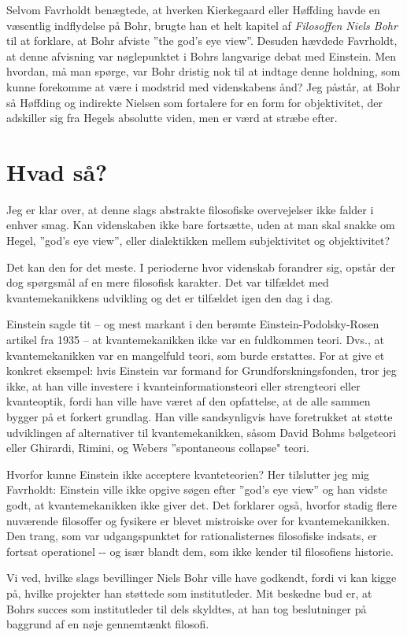 \documentclass[12pt]{article}
\begin{document}
Selvom Favrholdt benægtede, at hverken Kierkegaard eller Høffding havde
en væsentlig indflydelse på Bohr, brugte han et helt kapitel af
\emph{Filosoffen Niels Bohr} til at forklare, at Bohr afviste ''the
god's eye view''. Desuden hævdede Favrholdt, at denne afvisning var
nøglepunktet i Bohrs langvarige debat med Einstein. Men hvordan, må man
spørge, var Bohr dristig nok til at indtage denne holdning, som kunne
forekomme at være i modstrid med videnskabens ånd? Jeg påstår, at Bohr
så Høffding og indirekte Nielsen som fortalere for en form for
objektivitet, der adskiller sig fra Hegels absolutte viden, men er værd
at stræbe efter.

\hypertarget{hvad-suxe5}{%
\section{Hvad så?}\label{hvad-suxe5}}

Jeg er klar over, at denne slags abstrakte filosofiske overvejelser ikke
falder i enhver smag. Kan videnskaben ikke bare fortsætte, uden at man
skal snakke om Hegel, ''god's eye view'', eller dialektikken mellem
subjektivitet og objektivitet?

Det kan den for det meste. I perioderne hvor videnskab forandrer sig,
opstår der dog spørgsmål af en mere filosofisk karakter. Det var
tilfældet med kvantemekanikkens udvikling og det er tilfældet igen den
dag i dag.

Einstein sagde tit -- og mest markant i den berømte
Einstein-Podolsky-Rosen artikel fra 1935 -- at kvantemekanikken ikke
var en fuldkommen teori. Dvs., at kvantemekanikken var en mangelfuld
teori, som burde erstattes. For at give et konkret eksempel: hvis
Einstein var formand for Grundforskningsfonden, tror jeg ikke, at han
ville investere i kvanteinformationsteori eller strengteori eller
kvanteoptik, fordi han ville have været af den opfattelse, at de alle
sammen bygger på et forkert grundlag. Han ville sandsynligvis have
foretrukket at støtte udviklingen af alternativer til
kvantemekanikken, såsom David Bohms bølgeteori eller Ghirardi, Rimini,
og Webers ''spontaneous collapse" teori.

Hvorfor kunne Einstein ikke acceptere kvanteteorien? Her tilslutter jeg
mig Favrholdt: Einstein ville ikke opgive søgen efter ''god's eye view''
og han vidste godt, at kvantemekanikken ikke giver det. Det forklarer
også, hvorfor stadig flere nuværende filosoffer og fysikere er blevet
mistroiske over for kvantemekanikken. Den trang, som var udgangspunktet
for rationalisternes filosofiske indsats, er fortsat operationel -\/- og
især blandt dem, som ikke kender til filosofiens historie.

Vi ved, hvilke slags bevillinger Niels Bohr ville have godkendt, fordi
vi kan kigge på, hvilke projekter han støttede som institutleder. Mit
beskedne bud er, at Bohrs succes som institutleder til dels skyldtes, at
han tog beslutninger på baggrund af en nøje gennemtænkt filosofi.
\end{document}
